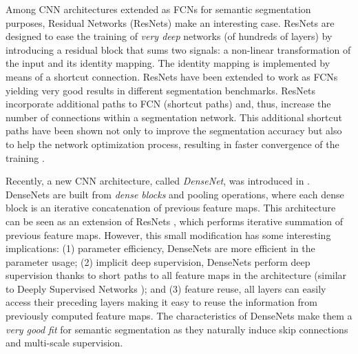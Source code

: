 \documentclass[10pt,twocolumn,letterpaper]{article}
\begin{document}
Among CNN architectures extended as FCNs for semantic segmentation purposes, Residual Networks (ResNets) \cite{HeZRS15} make an interesting case. ResNets are designed to ease the training of \emph{very deep} networks (of hundreds of layers) by introducing a residual block that sums two signals: a non-linear transformation of the input and its identity mapping. The identity mapping is implemented by means of a shortcut connection. ResNets have been extended to work as FCNs \cite{ChenPK0Y16, DrozdzalVCKP16} yielding very good results in different segmentation benchmarks. ResNets incorporate additional paths to FCN (shortcut paths) and, thus, increase the number of connections within a segmentation network. This additional shortcut paths have been shown not only to improve the segmentation accuracy but also to help the network optimization process, resulting in faster convergence of the training \cite{DrozdzalVCKP16}. 


Recently, a new CNN architecture, called \emph{DenseNet}, was introduced in \cite{DenseNet2016}. DenseNets are built from \emph{dense blocks} and pooling operations, where each dense block is an iterative concatenation of previous feature maps. This architecture can be seen as an extension of ResNets \cite{HeZRS15}, which performs iterative summation of previous feature maps. However, this small modification has some interesting implications: (1) parameter efficiency, DenseNets are more efficient in the parameter usage; (2) implicit deep supervision, DenseNets perform deep supervision thanks to short paths to all feature maps in the architecture (similar to Deeply Supervised Networks \cite{LeeXGZT15}); and (3) feature reuse, all layers can easily access their preceding layers making it easy to reuse the information from previously computed feature maps. The characteristics of DenseNets make them a \emph{very good fit} for semantic segmentation as they naturally induce skip connections and multi-scale supervision. 
\end{document}
